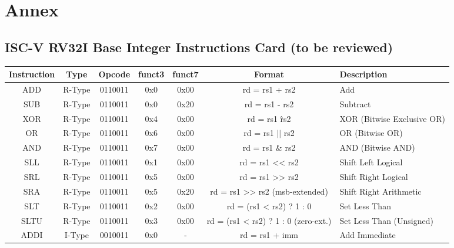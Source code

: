 

\section{Annex}

\subsection{ISC-V RV32I Base Integer Instructions Card (to be reviewed)}

\begin{table*}[h] %
    \centering
    \begin{tabular*}{\textwidth}{|c|c|c|c|c|c|l|} %
        \hline
        Instruction & Type   & Opcode   & funct3 & funct7 & Format & Description\\\hline
        ADD         & R-Type & 0110011  & 0x0    & 0x00   & rd = rs1 + rs2 & Add                              \\ \hline
        SUB         & R-Type & 0110011  & 0x0    & 0x20   & rd = rs1 - rs2 & Subtract                         \\ \hline
        XOR         & R-Type & 0110011  & 0x4    & 0x00   & rd = rs1 \^ rs2 & XOR (Bitwise Exclusive OR)       \\ \hline
        OR          & R-Type & 0110011  & 0x6    & 0x00   & rd = rs1 $||$ rs2 & OR (Bitwise OR)                  \\ \hline
        AND         & R-Type & 0110011  & 0x7    & 0x00   & rd = rs1 \& rs2 & AND (Bitwise AND)                \\ \hline
        SLL         & R-Type & 0110011  & 0x1    & 0x00   & rd = rs1 << rs2 & Shift Left Logical               \\ \hline
        SRL         & R-Type & 0110011  & 0x5    & 0x00   & rd = rs1 >> rs2 & Shift Right Logical              \\ \hline
        SRA         & R-Type & 0110011  & 0x5    & 0x20   & rd = rs1 >> rs2 (msb-extended) & Shift Right Arithmetic   \\ \hline
        SLT         & R-Type & 0110011  & 0x2    & 0x00   & rd = (rs1 < rs2) ? 1 : 0 & Set Less Than              \\ \hline
        SLTU        & R-Type & 0110011  & 0x3    & 0x00   & rd = (rs1 < rs2) ? 1 : 0 (zero-ext.) & Set Less Than (Unsigned) \\ \hline
        ADDI        & I-Type & 0010011  & 0x0    & -      & rd = rs1 + imm & Add Immediate                  \\ \hline

\end{tabular*}
\end{table*}
